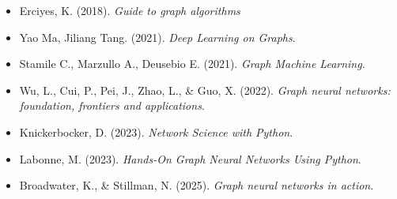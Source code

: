 \documentclass[aspectratio=169]{beamer}
\begin{document}
    \begin{frame}[allowframebreaks]
        \footnotesize %
        
        \begin{itemize}
            \item Erciyes, K. (2018). \textit{Guide to graph algorithms} %
            \item Yao Ma, Jiliang Tang. (2021). \textit{Deep Learning on Graphs}.
            \item Stamile C., Marzullo A., Deusebio E. (2021). \textit{Graph Machine Learning}.
            \item Wu, L., Cui, P., Pei, J., Zhao, L., \& Guo, X. (2022). \textit{Graph neural networks: foundation, frontiers and applications}. %
            \item Knickerbocker, D. (2023). \textit{Network Science with Python}. %
            \item Labonne, M. (2023). \textit{Hands-On Graph Neural Networks Using Python}.
            \item Broadwater, K., \& Stillman, N. (2025). \textit{Graph neural networks in action}. %
        \end{itemize}
    \end{frame}
\end{document}
